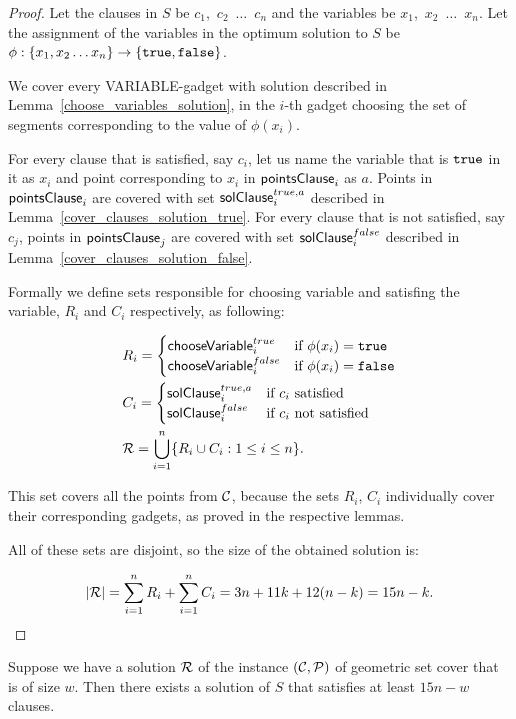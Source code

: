 \begin{proof}
Let the clauses in $S$ be $c_1$,~$c_2$~$\ldots$~$c_n$
and the variables be $x_1$,~$x_2$~$\ldots$~$x_n$.
Let the assignment of the variables in
the optimum solution to $S$ be
$\phi : \{ x_1, x_2 \ldots x_n\} \rightarrow \{\texttt{true}, \texttt{false}\}$.


We cover every VARIABLE-gadget with solution described in
Lemma~\ref{choose_variables_solution},
in the $i$-th gadget choosing the set of segments corresponding to the
value of $\phi(x_i)$.

For every clause that is satisfied, say $c_i$, 
let us name the variable that is $\texttt{true}$ in it as $x_i$
and point corresponding to $x_i$ in $\mathsf{pointsClause}_i$ as $a$.
Points in $\mathsf{pointsClause}_i$ 
are covered with set $\mathsf{solClause}^{true,a}_i$ described in
Lemma~\ref{cover_clauses_solution_true}.
For every clause that is not satisfied, say $c_j$,
points in $\mathsf{pointsClause}_j$ are covered
with set $\mathsf{solClause}^{false}_i$ described in
Lemma~\ref{cover_clauses_solution_false}.

Formally we define 
sets responsible for choosing variable and satisfing the variable,
$R_i$ and $C_i$ respectively, as following:

\begin{align}
	\begin{split}
	& R_i = \begin{cases}
		\mathsf{chooseVariable}^{true}_{i} & \text{if}\ \phi(x_i) = \texttt{true} \\
		\mathsf{chooseVariable}^{false}_{i} & \text{if}\ \phi(x_i) = \texttt{false} \\
		\end{cases} \\
	& C_i = \begin{cases}
		\mathsf{solClause}^{true,a}_i & \text{if}\ c_i \text{ satisfied} \\
		\mathsf{solClause}^{false}_i & \text{if}\ c_i \text{ not satisfied}
		\end{cases} \\
	& \mathcal{R} = \bigcup\limits_{i=1}^{n} \{R_i \cup C_i : 1 \le i \le n\}.
    \end{split}
\end{align}


This set covers all the points from $\mathcal{C}$, because
the sets $R_i$, $C_i$ individually cover their corresponding gadgets,
as proved in the respective lemmas.

All of these sets are disjoint, so the size of the obtained solution is:

$$|\mathcal{R}| = \sum_{i=1}^{n} R_i + \sum_{i=1}^n C_i = 3n + 11k + 12(n-k) = 15n - k.$$
\end{proof}
\begin{lemma}
	\label{construction_completness}
	Suppose we have a solution $\mathcal{R}$ of the instance $(\mathcal{C}, \mathcal{P})$
	of geometric set cover that is of size $w$.
	Then there exists a solution of $S$
	that satisfies at least $15n - w$ clauses.
\end{lemma}


